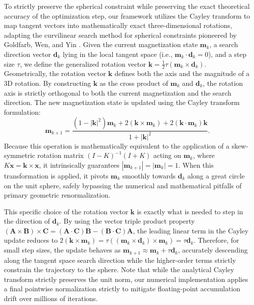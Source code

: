 \documentclass[10pt, a4paper, twocolumn]{article}
\begin{document}
To strictly preserve the spherical constraint while preserving the exact theoretical accuracy of the optimization step, our framework utilizes the Cayley transform to map tangent vectors into mathematically exact three-dimensional rotations, adapting the curvilinear search method for spherical constraints pioneered by Goldfarb, Wen, and Yin \cite{Wen2009}. Given the current magnetization state $\mathbf{m}_k$, a search direction vector $\mathbf{d}_k$ lying in the local tangent space (i.e., $\mathbf{m}_k \cdot \mathbf{d}_k = 0$), and a step size $\tau$, we define the generalized rotation vector $\mathbf{k} = \frac{1}{2}\tau (\mathbf{m}_k \times \mathbf{d}_k)$. Geometrically, the rotation vector $\mathbf{k}$ defines both the axis and the magnitude of a 3D rotation. By constructing $\mathbf{k}$ as the cross product of $\mathbf{m}_k$ and $\mathbf{d}_k$, the rotation axis is strictly orthogonal to both the current magnetization and the search direction. The new magnetization state is updated using the Cayley transform formulation:
\begin{equation}
    \mathbf{m}_{k+1} = \frac{(1 - |\mathbf{k}|^2)\mathbf{m}_k + 2(\mathbf{k} \times \mathbf{m}_k) + 2(\mathbf{k} \cdot \mathbf{m}_k)\mathbf{k}}{1 + |\mathbf{k}|^2}.
\end{equation}
Because this operation is mathematically equivalent to the application of a skew-symmetric rotation matrix $(I - K)^{-1}(I + K)$ acting on $\mathbf{m}_k$, where $K \mathbf{x} = \mathbf{k} \times \mathbf{x}$, it intrinsically guarantees $|\mathbf{m}_{k+1}| = |\mathbf{m}_k| = 1$. When this transformation is applied, it pivots $\mathbf{m}_k$ smoothly towards $\mathbf{d}_k$ along a great circle on the unit sphere, safely bypassing the numerical and mathematical pitfalls of primary geometric renormalization. 

This specific choice of the rotation vector $\mathbf{k}$ is exactly what is needed to step in the direction of $\mathbf{d}_k$. By using the vector triple product property $(\mathbf{A} \times \mathbf{B}) \times \mathbf{C} = (\mathbf{A} \cdot \mathbf{C})\mathbf{B} - (\mathbf{B} \cdot \mathbf{C})\mathbf{A}$, the leading linear term in the Cayley update reduces to $2(\mathbf{k} \times \mathbf{m}_k) = \tau ((\mathbf{m}_k \times \mathbf{d}_k) \times \mathbf{m}_k) = \tau \mathbf{d}_k$. Therefore, for small step sizes, the update behaves as $\mathbf{m}_{k+1} \approx \mathbf{m}_k + \tau \mathbf{d}_k$, accurately descending along the tangent space search direction while the higher-order terms strictly constrain the trajectory to the sphere. Note that while the analytical Cayley transform strictly preserves the unit norm, our numerical implementation applies a final pointwise normalization strictly to mitigate floating-point accumulation drift over millions of iterations.
\end{document}
